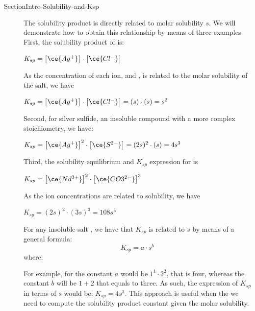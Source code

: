 \documentclass[main.tex]{subfiles}
\newcommand\chapterlabel{Ch-solubility}\setcounter{figurenewcounter}{0}\setcounter{tablenewcounter}{0}\setcounter{formulanewcounter}{0}
\begin{document}
\section{}  {SectionIntro-Solubility-and-Ksp}
\sloppy\begin{description}





\item[] The solubility product is directly related to molar solubility $s$. We will demonstrate how to obtain this relationship by means of three examples.
First, the solubility product of  is:
\begin{center}\hfill $K_{sp}= \big[ \ce{Ag^{+}} \big]\cdot \big[ \ce{Cl^{-}} \big]$\end{center}
As the concentration of each ion,  and , is related to the molar solubility of the salt, we have
\begin{center}$K_{sp}= \big[ \ce{Ag^{+}} \big]\cdot \big[ \ce{Cl^{-}} \big]=(s)\cdot(s)=s^2$\end{center}
Second, for silver sulfide, an insoluble compound with a more complex stoichiometry, we have:
\begin{center}\hfill $K_{sp}= \big[ \ce{Ag^{+}} \big]^2\cdot \big[ \ce{S^{2-}} \big]=(2s)^2\cdot(s)=4s^3 $\end{center}
Third, the solubility equilibrium and $K_{sp}$ expression for  is
\begin{center}\hfill $K_{sp}= \big[ \ce{Nd^{3+}} \big]^2\cdot \big[ \ce{CO3^{2-}} \big]^3$\end{center}
As the ion concentrations are related to solubility, we have
\begin{center}$K_{sp}=(2s)^2\cdot(3s)^3=108s^5 $\end{center}

\item[] For any insoluble salt , we have that $K_{sp}$ is related to $s$ by means of a general formula:
\begin{equation}
\boxed{ K_{sp}= a\cdot s^b  }\label{\chapterlabel:equation2}
\end{equation}
where:
For example, for  the constant $a$ would be $1^1\cdot 2^2$, that is four, whereas the constant $b$ will be $1+2$ that equals to three. As such, the expression of $K_{sp}$ in terms of $s$ would be: $K_{sp}=4s^3$. This approach is useful when the we need to compute the solubility product constant given the molar solubility.


\end{description}
\end{document}

